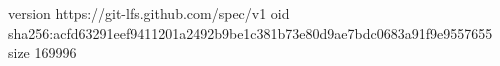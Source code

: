 version https://git-lfs.github.com/spec/v1
oid sha256:acfd63291eef9411201a2492b9be1c381b73e80d9ae7bdc0683a91f9e9557655
size 169996
